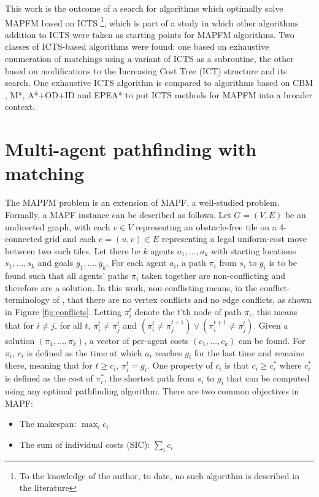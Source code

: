 \documentclass[english]{article}
\begin{document}
	This work is the outcome of a search for algorithms which optimally solve MAPFM based on ICTS \footnote{To the knowledge of the author, to date, no such algorithm is described in the literature}, which is part of a study in which other algorithms addition to ICTS were taken as starting points for MAPFM algorithms. Two classes of ICTS-based algorithms were found: one based on exhaustive enumeration of matchings using a variant of ICTS as a subroutine, the other based on modifications to the Increasing Cost Tree (ICT) structure and its search. One exhaustive ICTS algorithm is compared to algorithms based on CBM \cite{ma2016}, M*\cite{wagner2011}, A*+OD+ID\cite{standley2010} and EPEA*\cite{goldenberg2014} to put ICTS methods for MAPFM into a broader context.
	
	\section{Multi-agent pathfinding with matching} %
	\label{mapfm}
	The MAPFM problem is an extension of MAPF, a well-studied problem. Formally, a MAPF instance can be described as follows. Let $G = (V,E)$ be an undirected graph, with each $v\in V$ representing an obstacle-free tile on a 4-connected grid and each $e = (u,v)\in E$ representing a legal uniform-cost move between two such tiles. Let there be $k$ agents $a_1,\ldots,a_k$ with starting locations $s_1,\ldots,s_k$ and goals $g_1,\ldots,g_k$. For each agent $a_i$, a path $\pi_i$ from $s_i$ to $g_i$ is to be found such that all agents' paths $\pi_i$ taken together are non-conflicting and therefore are a solution. In this work, non-conflicting means, in the conflict-terminology of \cite{stern2019}, that there are no vertex conflicts and no edge conflicts, as shown in Figure \ref{fig:conflicts}. Letting $\pi_i^t$ denote the $t$'th node of path $\pi_i$, this means that for $i\neq j$, for all $t$, $\pi_i^t\neq \pi_j^t$ and $(\pi_i^t \neq \pi_j^{t + 1})\lor(\pi_i^{t+1} \neq \pi_j^t)$. Given a solution $(\pi_1,\ldots,\pi_k)$, a vector of per-agent costs $(c_1,\ldots,c_k)$ can be found. For $\pi_i$, $c_i$ is defined as the time at which $a_i$ reaches $g_i$ for the last time and remains there, meaning that for $t \geq c_i$, $\pi_i^{t} = g_i$. One property of $c_i$ is that $c_i \geq c^*_i$ where $c^*_i$ is defined as the cost of $\pi^*_i$, the shortest path from $s_i$ to $g_i$ that can be computed using any optimal pathfinding algorithm. There are two common objectives in MAPF:
	\begin{itemize}
		\item The makespan: $\max_{i} c_i$
		\item The sum of individual costs (SIC): $\sum_i c_i$
	\end{itemize}
\end{document}
